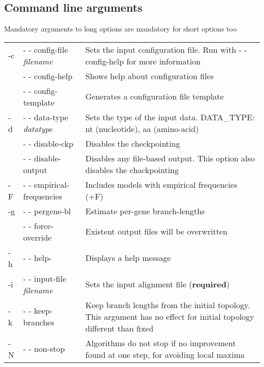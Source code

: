 \documentclass[11pt,twoside,a4paper]{article}
\begin{document}
\subsection{Command line arguments}

Mandatory arguments to long options are mandatory for short options too

\begin{flushleft}
\renewcommand{\arraystretch}{1.5}
\small {
\begin{tabular}{@{}llp{.7\linewidth}@{}}
-c & - - config-file {\it filename}
   &   Sets the input configuration file. Run with - - config-help for more information \\

 &- - config-help 
 &      Shows help about configuration files \\

 & - - config-template 
 &      Generates a configuration file template \\

-d& - - data-type {\it datatype} 
  &     Sets the type of the input data. DATA\_TYPE: nt (nucleotide), aa (amino-acid) \\

  &- - disable-ckp 
  &     Disables the checkpointing \\

  &- - disable-output 
  &     Disables any file-based output. This option also disables the chackpointing\\

-F & - - empirical-frequencies
   &    Includes models with empirical frequencies (+F) \\

-g& - - pergene-bl
  &     Estimate per-gene branch-lengths \\

&- - force-override
&Existent output files will be overwritten \\

-h& - - help-
  &     Displays a help message \\

-i& - - input-file {\it filename}
  &     Sets the input alignment file ({\bf required}) \\

-k& - - keep-branches
  &     Keep branch lengths from the initial topology. This argument has no effect for initial topology different than fixed \\

-N& - - non-stop
  &     Algorithms do not stop if no improvement found at one step, for avoiding local maxima \\


\end{tabular}}
\end{flushleft}
\end{document}
